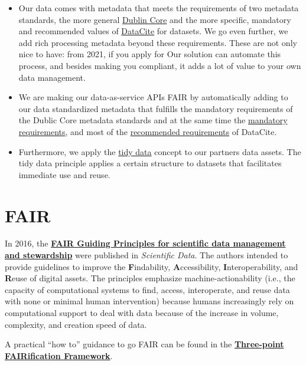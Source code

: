 \documentclass[
  a4paper,
  openany, a4paper, oneside]{book}
\begin{document}
\begin{itemize}
\item
  Our data comes with metadata that meets the requirements of two metadata standards, the more general \protect\hyperlink{Dublin-Core}{Dublin Core} and the more specific, mandatory and recommended values of \protect\hyperlink{DataCite}{DataCite} for datasets. We go even further, we add rich processing metadata beyond these requirements. These are not only nice to have: from 2021, if you apply for Our solution can automate this process, and besides making you compliant, it adds a lot of value to your own data management.
\item
  We are making our data-as-service APIs FAIR by automatically adding to our data standardized metadata that fulfills the mandatory requirements of the Dublic Core metadata standards and at the same time the \href{https://support.datacite.org/docs/datacite-metadata-schema-v44-mandatory-properties}{mandatory requirements}, and most of the \href{https://support.datacite.org/docs/datacite-metadata-schema-v44-recommended-and-optional-properties}{recommended requirements} of DataCite.
\item
  Furthermore, we apply the \protect\hyperlink{tidy-data}{tidy data} concept to our partners data assets. The tidy data principle applies a certain structure to datasets that facilitates immediate use and reuse.
\end{itemize}

\hypertarget{FAIR}{%
\section{FAIR}\label{FAIR}}

In 2016, the \textbf{\href{http://www.nature.com/articles/sdata201618}{FAIR Guiding Principles for scientific data management and stewardship}} were published in \emph{Scientific Data}. The authors intended to provide guidelines to improve the \textbf{F}indability, \textbf{A}ccessibility, \textbf{I}nteroperability, and \textbf{R}euse of digital assets. The principles emphasize machine-actionability (i.e., the capacity of computational systems to find, access, interoperate, and reuse data with none or minimal human intervention) because humans increasingly rely on computational support to deal with data because of the increase in volume, complexity, and creation speed of data.

A practical ``how to'' guidance to go FAIR can be found in the \textbf{\href{https://www.go-fair.org/how-to-go-fair/}{Three-point FAIRification Framework}}.
\end{document}

